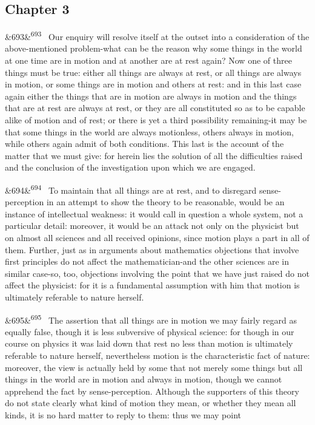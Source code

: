 \documentclass[12pt]{article}
\newcommand{\para}[1][]{\par\noindent\ifx&#1&\else\textsuperscript{\footnotesize #1}~\fi}
\begin{document}
\subsection*{Chapter 3}

\para[693] Our enquiry will resolve itself at the outset into a consideration of the above-mentioned problem-what can be the reason why some things in the world at one time are in motion and at another are at rest again? Now one of three things must be true: either all things are always at rest, or all things are always in motion, or some things are in motion and others at rest: and in this last case again either the things that are in motion are always in motion and the things that are at rest are always at rest, or they are all constituted so as to be capable alike of motion and of rest; or there is yet a third possibility remaining-it may be that some things in the world are always motionless, others always in motion, while others again admit of both conditions. This last is the account of the matter that we must give: for herein lies the solution of all the difficulties raised and the conclusion of the investigation upon which we are engaged.

\para[694] To maintain that all things are at rest, and to disregard sense-perception in an attempt to show the theory to be reasonable, would be an instance of intellectual weakness: it would call in question a whole system, not a particular detail: moreover, it would be an attack not only on the physicist but on almost all sciences and all received opinions, since motion plays a part in all of them. Further, just as in arguments about mathematics objections that involve first principles do not affect the mathematician-and the other sciences are in similar case-so, too, objections involving the point that we have just raised do not affect the physicist: for it is a fundamental assumption with him that motion is ultimately referable to nature herself.

\para[695] The assertion that all things are in motion we may fairly regard as equally false, though it is less subversive of physical science: for though in our course on physics it was laid down that rest no less than motion is ultimately referable to nature herself, nevertheless motion is the characteristic fact of nature: moreover, the view is actually held by some that not merely some things but all things in the world are in motion and always in motion, though we cannot apprehend the fact by sense-perception. Although the supporters of this theory do not state clearly what kind of motion they mean, or whether they mean all kinds, it is no hard matter to reply to them: thus we may point
\end{document}
